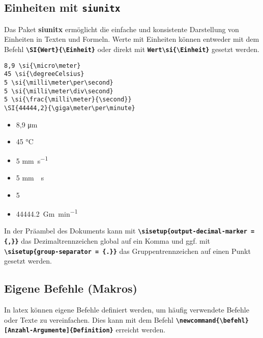 \subsection{Einheiten mit \texttt{siunitx}}

Das Paket \textbf{siunitx} ermöglicht die einfache und konsistente Darstellung von Einheiten in Texten und Formeln.
Werte mit Einheiten können entweder mit dem Befehl \textbf{\texttt{\textbackslash SI\{Wert\}\{\textbackslash Einheit\}}} oder direkt mit \textbf{\texttt{Wert\textbackslash si\{\textbackslash Einheit\}}} gesetzt werden.

\begin{minipage}[c]{0.6\textwidth}
    \begin{lstlisting}[language={[LaTeX]TeX}, lineskip=2pt]
8,9 \si{\micro\meter}               
45 \si{\degreeCelsius}              
5 \si{\milli\meter\per\second}      
5 \si{\milli\meter\div\second}      
5 \si{\frac{\milli\meter}{\second}} 
\SI{44444,2}{\giga\meter\per\minute}    
    \end{lstlisting}
\end{minipage}
\hfill
\begin{minipage}[c]{0.3\textwidth}
    \begin{itemize}[itemsep=2pt, label=$\rightarrow$]
        \item 8,9 \si{\micro\meter}
        \item 45 \si{\degreeCelsius}
        \item 5 \si{\milli\meter\per\second}
        \item 5 \si{\milli\meter\div\second}
        \item 5 \si{\frac{\milli\meter}{\second}}
        \item \SI{44444,2}{\giga\meter\per\minute}
    \end{itemize}
\end{minipage}

In der Präambel des Dokuments kann mit \texttt{\textbf{\textbackslash sisetup\{output-decimal-marker = \{,\}\}}} das Dezimaltrennzeichen global auf ein Komma und ggf. mit \textbf{\texttt{\textbackslash sisetup\{group-separator = \{.\}\}}} das Gruppentrennzeichen auf einen Punkt gesetzt werden.


\subsection{Eigene Befehle (Makros)}
In latex können eigene Befehle definiert werden, um häufig verwendete Befehle oder Texte zu vereinfachen. Dies kann mit dem Befehl \textbf{\texttt{\textbackslash newcommand\{\textbackslash befehl\}[Anzahl-Argumente]\{Definition\}}} erreicht werden.

